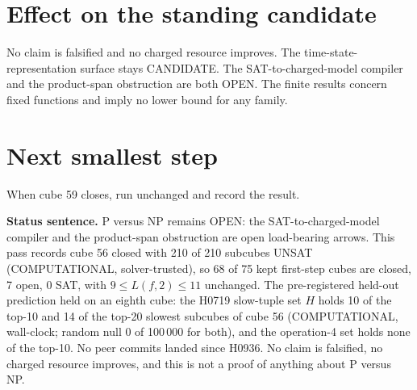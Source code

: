 \documentclass[11pt]{article}
\begin{document}
\section*{Effect on the standing candidate}
No claim is falsified and no charged resource improves. The time-state-representation surface stays CANDIDATE. The SAT-to-charged-model compiler and the product-span obstruction are both OPEN. The finite results concern fixed functions and imply no lower bound for any family.

\section*{Next smallest step}
When cube 59 closes, run  unchanged and record the result.

\bigskip
\noindent\textbf{Status sentence.} P versus NP remains OPEN: the SAT-to-charged-model compiler and the product-span obstruction are open load-bearing arrows. This pass records cube 56 closed with 210 of 210 subcubes UNSAT (COMPUTATIONAL, solver-trusted), so 68 of 75 kept first-step cubes are closed, 7 open, 0 SAT, with $9\le L(f,2)\le 11$ unchanged. The pre-registered held-out prediction held on an eighth cube: the H0719 slow-tuple set $H$ holds 10 of the top-10 and 14 of the top-20 slowest subcubes of cube 56 (COMPUTATIONAL, wall-clock; random null 0 of 100\,000 for both), and the operation-4 set holds none of the top-10. No peer commits landed since H0936. No claim is falsified, no charged resource improves, and this is not a proof of anything about P versus NP.
\end{document}
